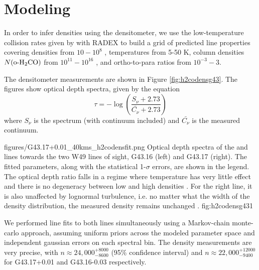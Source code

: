\section{Modeling \formaldehyde}
In order to infer densities using the \formaldehyde densitometer, we use the
low-temperature collision rates given by \citet{Troscompt2009a} with RADEX
\citep{van-der-Tak2007a} to build a grid of predicted line properties covering
densities from $10-10^8$ \hh \percc, temperatures from 5-50 K, column densities
$N(\textrm{o-H}_2\textrm{CO})$ from $10^{11}-10^{16}$ \persc, and ortho-to-para ratios from
$10^{-3}-3$.

The \formaldehyde densitometer measurements are shown in Figure \ref{fig:h2codensg43}.
The figures show optical depth spectra, given by the equation
\begin{equation}
    \tau = -\log\left(\frac{S_\nu + 2.73}{\bar{C_\nu} + 2.73}\right)
\end{equation}
where $S_\nu$ is the spectrum (with continuum included) and $\bar{C_\nu}$ is
the measured continuum.

{figures/G43.17+0.01_40kms_h2codensfit.png}
{Optical depth spectra of the \oneone and \twotwo lines towards the two W49
lines of sight, G43.16 (left) and G43.17 (right).  The fitted parameters, along with the statistical 1-$\sigma$
errors, are shown in the legend.  The optical depth ratio falls in a regime
where temperature has very little effect and there is no degeneracy between low
and high densities \citep[see Figure 2 of][]{Ginsburg2011a}.  For the right line,
it is also unaffected by lognormal turbulence, i.e. no matter what the width of
the density distribution, the measured density remains unchanged \citep[see
Figure 3 of][]{Ginsburg2011a}.}
{fig:h2codensg43}{1}

We performed line fits to both lines simultaneously using a Markov-chain
monte-carlo approach, assuming uniform priors across the modeled parameter
space and independent gaussian errors on each spectral bin.
The density measurements are very precise, with $n\approx24,000 {}^{+8000}_{-8600}$ 
\percc (95\% confidence interval) and $n\approx 22,000 {}^{+12000}_{-9400}$ \percc for
G43.17+0.01 and G43.16-0.03 respectively.  

